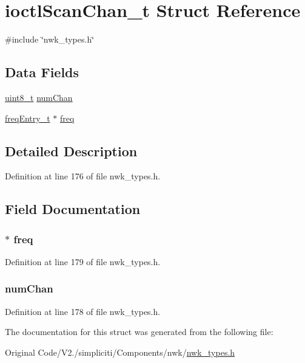 \hypertarget{structioctlScanChan__t}{\section{ioctl\-Scan\-Chan\-\_\-t \-Struct \-Reference}
\label{structioctlScanChan__t}
}


{\ttfamily \#include \char`\"{}nwk\-\_\-types.\-h\char`\"{}}

\subsection*{\-Data \-Fields}
\begin{DoxyCompactItemize}
\item 
\hyperlink{bsp__msp430__defs_8h_aba7bc1797add20fe3efdf37ced1182c5}{uint8\-\_\-t} \hyperlink{structioctlScanChan__t_a44e556259f16f30607b7ca7dc8fc7ab9}{num\-Chan}
\item 
\hyperlink{structfreqEntry__t}{freq\-Entry\-\_\-t} $\ast$ \hyperlink{structioctlScanChan__t_af4f77f0a95a9ef3f8d76c23fcc8b9198}{freq}
\end{DoxyCompactItemize}


\subsection{\-Detailed \-Description}


\-Definition at line 176 of file nwk\-\_\-types.\-h.



\subsection{\-Field \-Documentation}
\hypertarget{structioctlScanChan__t_af4f77f0a95a9ef3f8d76c23fcc8b9198}{
\subsubsection[{freq}]{$\ast$ {\bf freq}}}\label{structioctlScanChan__t_af4f77f0a95a9ef3f8d76c23fcc8b9198}


\-Definition at line 179 of file nwk\-\_\-types.\-h.

\hypertarget{structioctlScanChan__t_a44e556259f16f30607b7ca7dc8fc7ab9}{
\subsubsection[{num\-Chan}]{ {\bf num\-Chan}}}\label{structioctlScanChan__t_a44e556259f16f30607b7ca7dc8fc7ab9}


\-Definition at line 178 of file nwk\-\_\-types.\-h.



\-The documentation for this struct was generated from the following file\-:\begin{DoxyCompactItemize}
\item 
\-Original Code/\-V2./simpliciti/\-Components/nwk/\hyperlink{nwk__types_8h}{nwk\-\_\-types.\-h}\end{DoxyCompactItemize}

